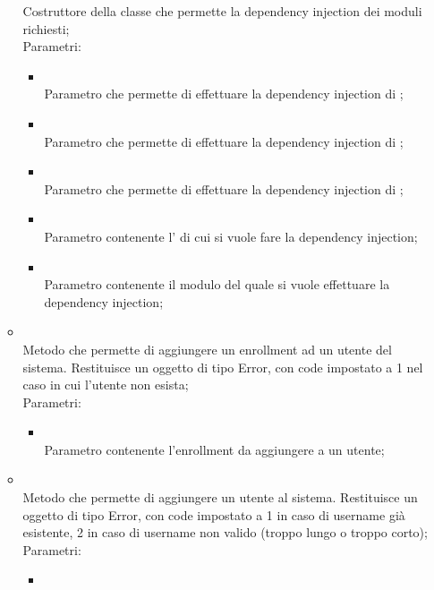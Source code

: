 \begin{itemize}
\begin{itemize}
		Costruttore della classe  che permette la dependency injection dei moduli richiesti;\\
		Parametri:
		\begin{itemize}
			\item {} \\
			Parametro che permette di effettuare la dependency injection di ;
			\item {} \\
			Parametro che permette di effettuare la dependency injection di ;
			\item {} \\
			Parametro che permette di effettuare la dependency injection di ;
			\item {} \\
			Parametro contenente l' di cui si vuole fare la dependency injection;
			\item {} \\
			Parametro contenente il modulo  del quale si vuole effettuare la dependency injection;
		\end{itemize}
		\item[]  \\
		Metodo che permette di aggiungere un enrollment ad un utente del sistema. Restituisce un oggetto di tipo Error, con code impostato a 1 nel caso in cui l'utente non esista;\\
		Parametri:
		\begin{itemize}
			\item {} \\
			Parametro contenente l'enrollment da aggiungere a un utente;
		\end{itemize}
		\item[]  \\
		Metodo che permette di aggiungere un utente al sistema. Restituisce un oggetto di tipo Error, con code impostato a 1 in caso di username già esistente, 2 in caso di username non valido (troppo lungo o troppo corto);\\
		Parametri:
		\begin{itemize}
			\item {} \\

\end{itemize}
\end{itemize}
\end{itemize}
